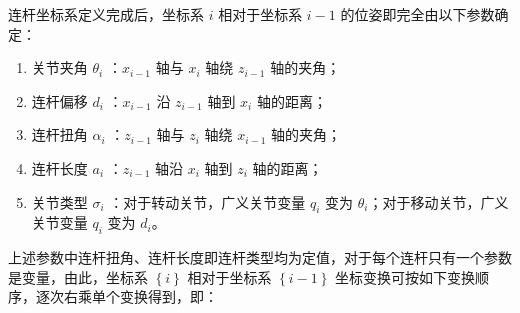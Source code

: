 \documentclass[cn,11pt,chinese,blue,bibstyle=ieeetr]{elegantbook}
\begin{document}
连杆坐标系定义完成后，坐标系 $i$ 相对于坐标系 $i-1$ 的位姿即完全由以下参数确定：
\begin{enumerate}
\item 关节夹角 $\theta_{i}$ ：$x_{i-1}$ 轴与 $x_i$ 轴绕 $z_{i-1}$ 轴的夹角；
\item 连杆偏移 $d_{i}$ ：$x_{i-1}$ 沿 $z_{i-1}$ 轴到 $x_i$ 轴的距离；
\item 连杆扭角 $\alpha_{i}$ ：$z_{i-1}$ 轴与 $z_i$ 轴绕 $x_{i-1}$ 轴的夹角；
\item 连杆长度 $a_{i}$ ：$z_{i-1}$ 轴沿 $x_i$ 轴到 $z_i$ 轴的距离；
\item 关节类型 $\sigma_i$ ：对于转动关节，广义关节变量 $q_i$ 变为 $\theta_{i}$；对于移动关节，广义关节变量 $q_i$ 变为 $d_i$。
\end{enumerate}

上述参数中连杆扭角、连杆长度即连杆类型均为定值，对于每个连杆只有一个参数是变量，由此，坐标系 $\left\{i\right\}$ 相对于坐标系 $\left\{i-1\right\}$ 坐标变换可按如下变换顺序，逐次右乘单个变换得到，即：
\end{document}
